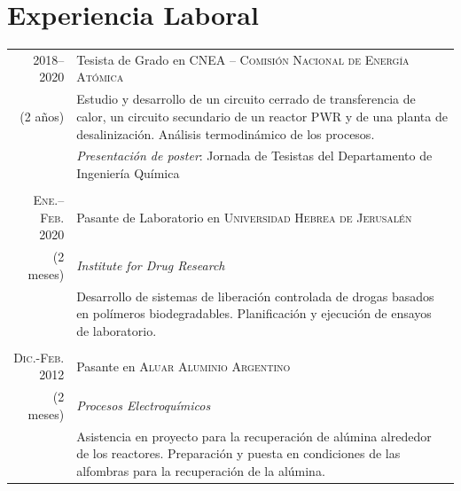 \documentclass[a4paper,10pt]{article}
\begin{document}
\section{Experiencia Laboral}\smallskip
\begin{tabular}{r|p{11cm}}
\textsc{2018--2020}&Tesista de Grado en \textsc{CNEA -- Comisión Nacional de Energía Atómica}  \\(2 años)&\footnotesize{Estudio y desarrollo de un circuito cerrado de transferencia de calor, un circuito secundario de un reactor PWR y de una planta de desalinización. Análisis termodinámico de los procesos.}
 \\&\footnotesize{\emph{Presentación de poster}: Jornada de Tesistas del Departamento de Ingeniería Química}\\\multicolumn{2}{c}{} \\

\textsc{Ene.--Feb. 2020} & Pasante de Laboratorio en \textsc{Universidad Hebrea de Jerusalén}\\(2 meses) & \emph{Institute for Drug Research}\\&\footnotesize{Desarrollo de sistemas de liberación controlada de drogas basados en polímeros biodegradables. Planificación y ejecución de ensayos de laboratorio.}\\\multicolumn{2}{c}{}\\
 
\textsc{Dic.-Feb. 2012} & Pasante en \textsc{Aluar Aluminio Argentino}\\(2 meses)& \emph{Procesos Electroquímicos}\\&\footnotesize{Asistencia en proyecto para la recuperación de alúmina alrededor de los reactores. Preparación y puesta en condiciones de las alfombras para la recuperación de la alúmina.}
\end{tabular}\smallskip
\end{document}
